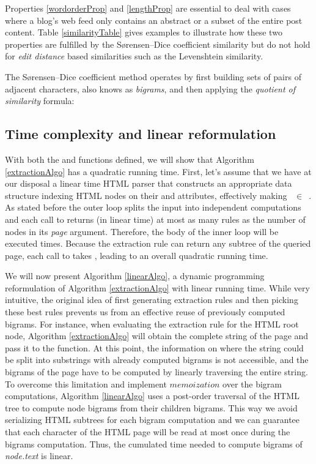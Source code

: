 Properties \ref{wordorderProp} and \ref{lengthProp} are essential to deal with cases where a blog's web feed only contains an abstract or a subset of the entire post content. Table \ref{similarityTable} gives examples to illustrate how these two properties are fulfilled by the Sørensen–Dice coefficient similarity but do not hold for \emph{edit distance} based similarities such as the Levenshtein\cite{levenshtein1966} similarity.

\similarityTable

The Sørensen–Dice coefficient method operates by first building sets of pairs of adjacent characters, also knows as \emph{bigrams}, and then applying the \emph{quotient of similarity} formula:

\similarityAlgo

\subsection{Time complexity and linear reformulation}
With both the  and  functions defined, we will show that Algorithm \ref{extractionAlgo} has a quadratic running time. First, let's assume that we have at our disposal a linear time HTML parser that constructs an appropriate data structure indexing HTML nodes on their  and  attributes, effectively making ~$\in$~. As stated before the outer loop splits the input into independent computations and each call to  returns (in linear time) at most as many rules as the number of nodes in its \emph{page} argument. Therefore, the body of the inner loop will be executed  times. Because the extraction rule can return any subtree of the queried page, each call to  takes , leading to an overall quadratic running time.

We will now present Algorithm \ref{linearAlgo}, a dynamic programming reformulation of Algorithm \ref{extractionAlgo} with linear running time. While very intuitive, the original idea of first generating extraction rules and then picking these best rules prevents us from an effective reuse of previously computed bigrams. For instance, when evaluating the extraction rule for the HTML root node, Algorithm \ref{extractionAlgo} will obtain the complete string of the page and pass it to the  function. At this point, the information on where the string could be split into substrings with already computed bigrams is not accessible, and the bigrams of the page have to be computed by linearly traversing the entire string. To overcome this limitation and implement $memoization$ over the bigram computations, Algorithm \ref{linearAlgo} uses a post-order traversal of the HTML tree to compute node bigrams from their children bigrams. This way we avoid serializing HTML subtrees for each bigram computation and we can guarantee that each character of the HTML page will be read at most once during the bigrams computation. Thus, the cumulated time needed to compute bigrams of \emph{node.text} is linear.

